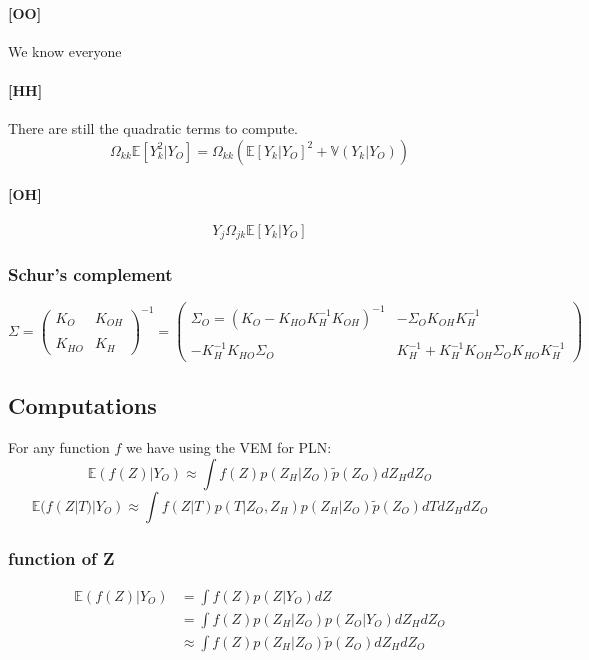 \documentclass[11pt,a4paper]{article}
\newcommand{\Esp}{\mathds{E}}
\begin{document}
\paragraph{[OO]} We know everyone
\paragraph{[HH]} There are still the quadratic terms to compute. 
$$ \Omega_{kk} \Esp[Y_k^2|Y_O] = \Omega_{kk} \left( \Esp [Y_k|Y_O]^2 + \mathds{V}(Y_k|Y_O)\right)$$

\paragraph{[OH]}$$ Y_j\Omega_{jk}\Esp[Y_k|Y_O]$$

\subsubsection{Schur's complement}

\[
 \Sigma=
  \left( {\begin{array}{cc}
  K_O &  K_{OH}\\\\
  K_{HO} & K_H
  \end{array} } \right)^{-1} =
  \left( {\begin{array}{cc}
  \Sigma_O =( K_O - K_{HO}K_H^{-1}K_{OH})^{-1} &  - \Sigma_O K_{OH}K_H^{-1}\\\\
 -K_H^{-1}K_{HO}\Sigma_O & K_H^{-1}+K_H^{-1}K_{OH}\Sigma_OK_{HO}K_H^{-1}
  \end{array} } \right)
  \]
\subsection{Computations}

For any function $f$ we have using the VEM for PLN:
$$\Esp(f(Z)|Y_O)  \approx \int f(Z) p(Z_H|Z_O)\tilde{p}(Z_O) dZ_H dZ_O$$
$$\Esp(f(Z|T)|Y_O)  \approx \int f(Z|T) p(T|Z_O,Z_H) p(Z_H|Z_O)\tilde{p}(Z_O) dT dZ_H dZ_O$$
\subsubsection{ function of Z}
\begin{align*}
\Esp(f(Z)|Y_O) &=\int f(Z) p(Z|Y_O) dZ\\
&=\int f(Z) p(Z_H|Z_O) p(Z_O|Y_O) dZ_H dZ_O\\
&\approx \int f(Z) p(Z_H|Z_O)\tilde{p}(Z_O) dZ_H dZ_O
\end{align*}
\end{document}
